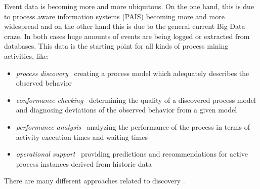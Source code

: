 Event data is becoming more and more ubiquitous. On the one hand, this is due to process aware information systems (PAIS) becoming more and more widespread and on the other hand this is due to the general current Big Data craze. In both cases huge amounts of events are being logged or extracted from databases.
This data is the starting point for all kinds of process mining activities, like:
\begin{itemize}
    \item \textit{process discovery} \textemdash \ creating a process model which adequately describes the observed behavior
    \item \textit{conformance checking} \textemdash \ determining the quality of a discovered process model and diagnosing deviations of the observed behavior from a given model
    \item \textit{performance analysis} \textemdash \ analyzing the performance of the process in terms of activity execution times and waiting times
    \item \textit{operational support} \textemdash \ providing predictions and recommendations for active process instances derived from historic data 
\end{itemize}
There are many different approaches related to discovery \cite{VanderAalst2016}. 